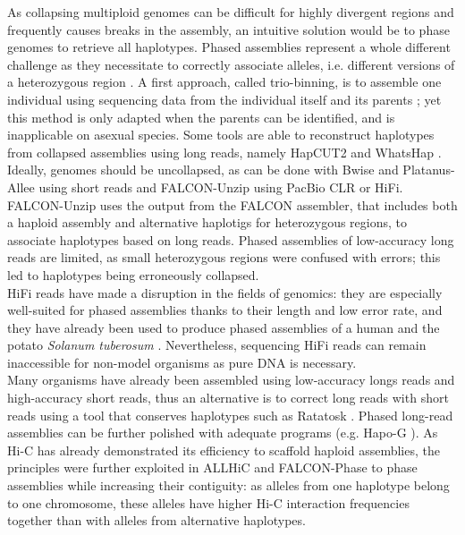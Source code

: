As collapsing multiploid genomes can be difficult for highly divergent regions and frequently causes breaks in the assembly, an intuitive solution would be to phase genomes to retrieve all haplotypes. Phased assemblies represent a whole different challenge as they necessitate to correctly associate alleles, i.e. different versions of a heterozygous region \cite{unzipping}. A first approach, called trio-binning, is to assemble one individual using sequencing data from the individual itself and its parents \cite{triocanu}; yet this method is only adapted when the parents can be identified, and is inapplicable on asexual species. Some tools are able to reconstruct haplotypes from collapsed assemblies using long reads, namely HapCUT2 \cite{hapcut2} and WhatsHap \cite{whatshap}. Ideally, genomes should be uncollapsed, as can be done with Bwise \cite{bwise} and Platanus-Allee \cite{platanus-allee} using short reads and FALCON-Unzip \cite{falcon-unzip} using PacBio CLR or HiFi. FALCON-Unzip uses the output from the FALCON assembler, that includes both a haploid assembly and alternative haplotigs for heterozygous regions, to associate haplotypes based on long reads. Phased assemblies of low-accuracy long reads are limited, as small heterozygous regions were confused with errors; this led to haplotypes being erroneously collapsed. \\

HiFi reads have made a disruption in the fields of genomics: they are especially well-suited for phased assemblies thanks to their length and low error rate, and they have already been used to produce phased assemblies of a human \cite{phased_human} and the potato \textit{Solanum tuberosum} \cite{potato}. Nevertheless, sequencing HiFi reads can remain inaccessible for non-model organisms as pure DNA is necessary. \\

Many organisms have already been assembled using low-accuracy longs reads and high-accuracy short reads, thus an alternative is to correct long reads with short reads using a tool that conserves haplotypes such as Ratatosk \cite{ratatosk}. Phased long-read assemblies can be further polished with adequate programs (e.g. Hapo-G \cite{hapog}). As Hi-C has already demonstrated its efficiency to scaffold haploid assemblies, the principles were further exploited in ALLHiC \cite{allhic} and FALCON-Phase \cite{falcon-phase} to phase assemblies while increasing their contiguity: as alleles from one haplotype belong to one chromosome, these alleles have higher Hi-C interaction frequencies together than with alleles from alternative haplotypes. \\

